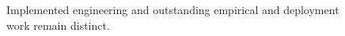 \begin{figure}[H]
\centering
{}
\caption{Implemented engineering and outstanding empirical and deployment work remain distinct.}\label{fig:teach-M08-11}
\end{figure}
